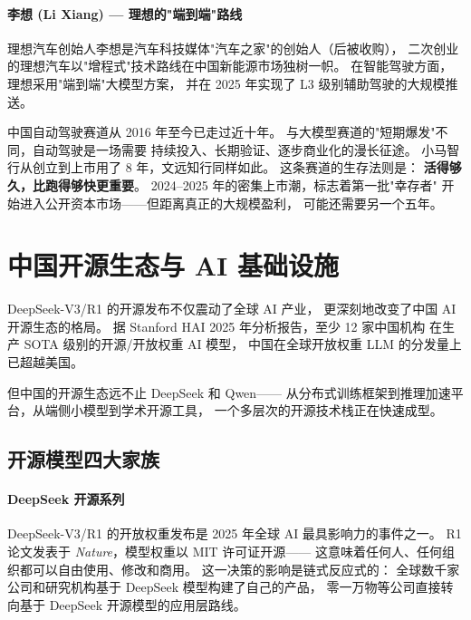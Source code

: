 \paragraph{李想 (Li Xiang) — 理想的"端到端"路线}
理想汽车创始人李想是汽车科技媒体"汽车之家"的创始人（后被收购），
二次创业的理想汽车以"增程式"技术路线在中国新能源市场独树一帜。
在智能驾驶方面，理想采用"端到端"大模型方案，
并在 2025 年实现了 L3 级别辅助驾驶的大规模推送。

\begin{whybox}[自动驾驶为什么是中国 AI 的"长征"？]
中国自动驾驶赛道从 2016 年至今已走过近十年。
与大模型赛道的"短期爆发"不同，自动驾驶是一场需要
持续投入、长期验证、逐步商业化的漫长征途。
小马智行从创立到上市用了 8 年，文远知行同样如此。
这条赛道的生存法则是：
\textbf{活得够久，比跑得够快更重要}。
2024--2025 年的密集上市潮，标志着第一批"幸存者"
开始进入公开资本市场——但距离真正的大规模盈利，
可能还需要另一个五年。
\end{whybox}



\section{中国开源生态与 AI 基础设施}
\label{sec:open-source}

DeepSeek-V3/R1 的开源发布不仅震动了全球 AI 产业，
更深刻地改变了中国 AI 开源生态的格局。
据 Stanford HAI 2025 年分析报告，至少 12 家中国机构
在生产 SOTA 级别的开源/开放权重 AI 模型，
中国在全球开放权重 LLM 的分发量上已超越美国。

但中国的开源生态远不止 DeepSeek 和 Qwen——
从分布式训练框架到推理加速平台，从端侧小模型到学术开源工具，
一个多层次的开源技术栈正在快速成型。


\subsection{开源模型四大家族}

\paragraph{DeepSeek 开源系列}
DeepSeek-V3/R1 的开放权重发布是 2025 年全球 AI 最具影响力的事件之一。
R1 论文发表于 \textit{Nature}，模型权重以 MIT 许可证开源——
这意味着任何人、任何组织都可以自由使用、修改和商用。
这一决策的影响是链式反应式的：
全球数千家公司和研究机构基于 DeepSeek 模型构建了自己的产品，
零一万物等公司直接转向基于 DeepSeek 开源模型的应用层路线。

